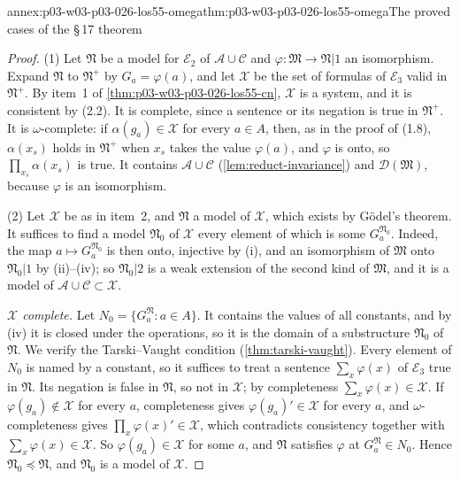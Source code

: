 \begin{annexitem}{annex:p03-w03-p03-026-los55-omega}{thm:p03-w03-p03-026-los55-omega}{The proved cases of the \S\,17 theorem}
\begin{proof}
(1) Let \(\mathfrak N\) be a model for \(\mathcal E_2\) of
\(\mathcal A\cup\mathcal C\) and \(\varphi\colon\mathfrak M\to\mathfrak N|1\) an
isomorphism.  Expand \(\mathfrak N\) to \(\mathfrak N^+\) by
\(G_a=\varphi(a)\), and let \(\mathcal X\) be the set of formulas of
\(\mathcal E_3\) valid in \(\mathfrak N^+\).  By item~1 of
\cref{thm:p03-w03-p03-026-los55-cn}, \(\mathcal X\) is a system, and it is
consistent by (2.2).  It is complete, since a sentence or its negation is true
in \(\mathfrak N^+\).  It is \(\omega\)-complete: if \(\alpha(g_a)\in\mathcal X\)
for every \(a\in A\), then, as in the proof of (1.8), \(\alpha(x_s)\) holds in
\(\mathfrak N^+\) when \(x_s\) takes the value \(\varphi(a)\), and \(\varphi\) is
onto, so \(\prod_{x_s}\alpha(x_s)\) is true.  It contains
\(\mathcal A\cup\mathcal C\) (\cref{lem:reduct-invariance}) and
\(\mathcal D(\mathfrak M)\), because \(\varphi\) is an isomorphism.

(2) Let \(\mathcal X\) be as in item~2, and \(\mathfrak N\) a model of
\(\mathcal X\), which exists by G\"odel's theorem.  It suffices to find a
model \(\mathfrak N_0\) of \(\mathcal X\) every element of which is some
\(G_a^{\mathfrak N_0}\).  Indeed, the map \(a\mapsto G_a^{\mathfrak N_0}\) is then
onto, injective by (i), and an isomorphism of \(\mathfrak M\) onto
\(\mathfrak N_0|1\) by (ii)--(iv); so \(\mathfrak N_0|2\) is a weak extension of
the second kind of \(\mathfrak M\), and it is a model of
\(\mathcal A\cup\mathcal C\subset\mathcal X\).

\emph{\(\mathcal X\) complete.}  Let \(N_0=\{G_a^{\mathfrak N}:a\in A\}\).  It
contains the values of all constants, and by (iv) it is closed under the
operations, so it is the domain of a substructure \(\mathfrak N_0\) of
\(\mathfrak N\).  We verify the Tarski--Vaught condition
(\cref{thm:tarski-vaught}).  Every element of \(N_0\) is named by a constant,
so it suffices to treat a sentence \(\sum_{x}\varphi(x)\) of \(\mathcal E_3\)
true in \(\mathfrak N\).  Its negation is false in \(\mathfrak N\), so not in
\(\mathcal X\); by completeness \(\sum_x\varphi(x)\in\mathcal X\).  If
\(\varphi(g_a)\notin\mathcal X\) for every \(a\), completeness gives
\(\varphi(g_a)'\in\mathcal X\) for every \(a\), and \(\omega\)-completeness
gives \(\prod_x\varphi(x)'\in\mathcal X\), which contradicts consistency
together with \(\sum_x\varphi(x)\in\mathcal X\).  So
\(\varphi(g_a)\in\mathcal X\) for some \(a\), and \(\mathfrak N\) satisfies
\(\varphi\) at \(G_a^{\mathfrak N}\in N_0\).  Hence
\(\mathfrak N_0\preccurlyeq\mathfrak N\), and \(\mathfrak N_0\) is a model of
\(\mathcal X\).


\end{proof}
\end{annexitem}
